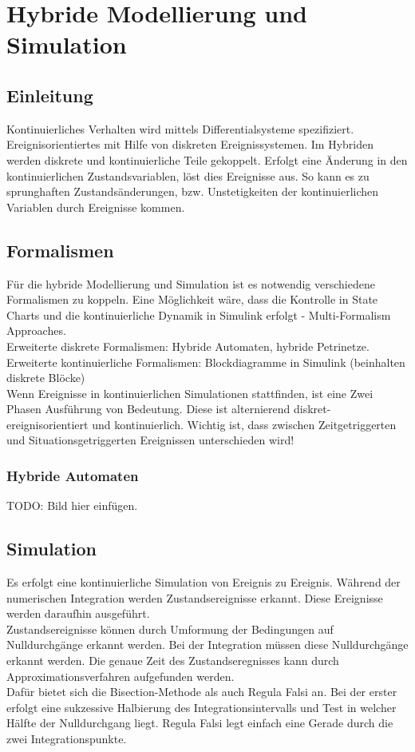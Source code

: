 \documentclass[11pt, fleqn, a4paper, leqno]{scrartcl} %
\begin{document}
	\section{Hybride Modellierung und Simulation}
		\subsection{Einleitung}
			Kontinuierliches Verhalten wird mittels Differentialsysteme spezifiziert. Ereignisorientiertes mit Hilfe von diskreten Ereignissystemen. Im Hybriden werden diskrete und kontinuierliche Teile gekoppelt. Erfolgt eine Änderung in den kontinuierlichen Zustandsvariablen, löst dies Ereignisse aus. So kann es zu sprunghaften Zustandsänderungen, bzw. Unstetigkeiten der kontinuierlichen Variablen durch Ereignisse kommen.\\
			\subsection{Formalismen}
				Für die hybride Modellierung und Simulation ist es notwendig verschiedene Formalismen zu koppeln. Eine Möglichkeit wäre, dass die Kontrolle in State Charts und die kontinuierliche Dynamik in Simulink erfolgt - \glqq Multi-Formalism Approaches\grqq.\\
				Erweiterte diskrete Formalismen: Hybride Automaten, hybride Petrinetze.\\
				Erweiterte kontinuierliche Formalismen: Blockdiagramme in Simulink (beinhalten diskrete Blöcke)\\
				Wenn Ereignisse in kontinuierlichen Simulationen stattfinden, ist eine Zwei Phasen Ausführung von Bedeutung. Diese ist alternierend diskret-ereignisorientiert und kontinuierlich. Wichtig ist, dass zwischen Zeitgetriggerten und Situationsgetriggerten Ereignissen unterschieden wird!
				\subsubsection{Hybride Automaten}
					TODO: Bild hier einfügen.
			\subsection{Simulation}
				Es erfolgt eine kontinuierliche Simulation von Ereignis zu Ereignis. Während der numerischen Integration werden Zustandsereignisse erkannt. Diese Ereignisse werden daraufhin ausgeführt.\\
				Zustandsereignisse können durch Umformung der Bedingungen auf Nulldurchgänge erkannt werden. Bei der Integration müssen diese Nulldurchgänge erkannt werden. Die genaue Zeit des Zustandseregnisses kann durch Approximationsverfahren aufgefunden werden.\\
				Dafür bietet sich die Bisection-Methode als auch Regula Falsi an. Bei der erster erfolgt eine sukzessive Halbierung des Integrationsintervalls und Test in welcher Hälfte der Nulldurchgang liegt. Regula Falsi legt einfach eine Gerade durch die zwei Integrationspunkte.
\end{document}
